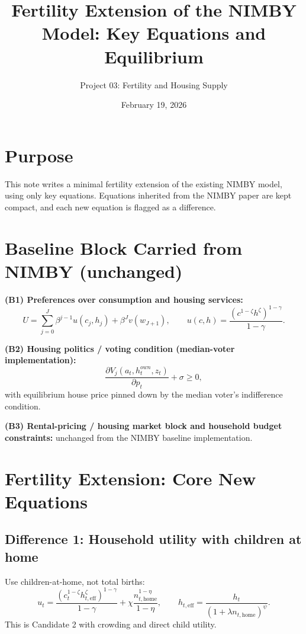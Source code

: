 \documentclass[11pt]{article}
\title{Fertility Extension of the NIMBY Model: Key Equations and Equilibrium}
\author{Project 03: Fertility and Housing Supply}
\date{February 19, 2026}
\begin{document}
\maketitle

\section*{Purpose}
This note writes a minimal fertility extension of the existing NIMBY model, using only key equations. Equations inherited from the NIMBY paper are kept compact, and each new equation is flagged as a difference.

\section{Baseline Block Carried from NIMBY (unchanged)}

\textbf{(B1) Preferences over consumption and housing services:}
\begin{equation}
U = \sum_{j=0}^{J}\beta^{j-1}u(c_j,h_j) + \beta^J v(w_{J+1}),
\qquad
u(c,h)=\frac{\left(c^{1-\zeta}h^{\zeta}\right)^{1-\gamma}}{1-\gamma}.
\end{equation}

\textbf{(B2) Housing politics / voting condition (median-voter implementation):}
\begin{equation}
\frac{\partial V_j(a_t,h_t^{own},z_t)}{\partial p_t} + \sigma \ge 0,
\end{equation}
with equilibrium house price pinned down by the median voter's indifference condition.

\textbf{(B3) Rental-pricing / housing market block and household budget constraints:}
unchanged from the NIMBY baseline implementation.

\section{Fertility Extension: Core New Equations}

\subsection*{Difference 1: Household utility with children at home}
Use children-at-home, not total births:
\begin{equation}
\label{eq:flow_new}
 u_t
=
\frac{\left(c_t^{1-\zeta}h_{t,\text{eff}}^{\zeta}\right)^{1-\gamma}}{1-\gamma}
+
\chi\frac{n_{t,\text{home}}^{1-\eta}}{1-\eta},
\qquad
h_{t,\text{eff}}=\frac{h_t}{(1+\lambda n_{t,\text{home}})^{\psi}}.
\end{equation}
This is Candidate 2 with crowding and direct child utility.
\end{document}
